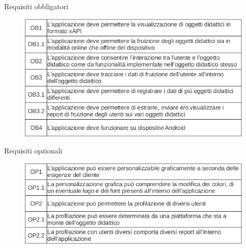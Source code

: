 \documentclass[aspectratio=43]{beamer}
\begin{document}
	\begin{frame}{Requisiti obbligatori}
		\begin{figure}[H]
			\centering
			\includegraphics[scale=0.71]{images/obb}
		\end{figure}
	\end{frame}

	\begin{frame}{Requisiti opzionali}
		\begin{figure}[H]
			\centering
			\includegraphics[scale=0.71]{images/opz}
		\end{figure}
	\end{frame}
\end{document}
